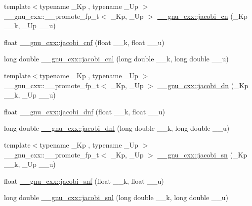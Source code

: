 \begin{DoxyCompactItemize}
\item 
{\footnotesize template$<$typename \+\_\+\+Kp , typename \+\_\+\+Up $>$ }\\\+\_\+\+\_\+gnu\+\_\+cxx\+::\+\_\+\+\_\+promote\+\_\+fp\+\_\+t$<$ \+\_\+\+Kp, \+\_\+\+Up $>$ \hyperlink{group__gnu__math__spec__func_ga51512996a910489b4554daa7507a48f1}{\+\_\+\+\_\+gnu\+\_\+cxx\+::jacobi\+\_\+cn} (\+\_\+\+Kp \+\_\+\+\_\+k, \+\_\+\+Up \+\_\+\+\_\+u)
\item 
float \hyperlink{group__gnu__math__spec__func_gadbd6320123f45ae10d539cf8df0373cd}{\+\_\+\+\_\+gnu\+\_\+cxx\+::jacobi\+\_\+cnf} (float \+\_\+\+\_\+k, float \+\_\+\+\_\+u)
\item 
long double \hyperlink{group__gnu__math__spec__func_ga08892965ea520116cc53a764513fe685}{\+\_\+\+\_\+gnu\+\_\+cxx\+::jacobi\+\_\+cnl} (long double \+\_\+\+\_\+k, long double \+\_\+\+\_\+u)
\item 
{\footnotesize template$<$typename \+\_\+\+Kp , typename \+\_\+\+Up $>$ }\\\+\_\+\+\_\+gnu\+\_\+cxx\+::\+\_\+\+\_\+promote\+\_\+fp\+\_\+t$<$ \+\_\+\+Kp, \+\_\+\+Up $>$ \hyperlink{group__gnu__math__spec__func_ga4c2e5ff17abaab5217d4dbcbfd7366d8}{\+\_\+\+\_\+gnu\+\_\+cxx\+::jacobi\+\_\+dn} (\+\_\+\+Kp \+\_\+\+\_\+k, \+\_\+\+Up \+\_\+\+\_\+u)
\item 
float \hyperlink{group__gnu__math__spec__func_gae96327d678adc6b5c4051f1c3649549a}{\+\_\+\+\_\+gnu\+\_\+cxx\+::jacobi\+\_\+dnf} (float \+\_\+\+\_\+k, float \+\_\+\+\_\+u)
\item 
long double \hyperlink{group__gnu__math__spec__func_gae59786991abbf8359deef49b6323065a}{\+\_\+\+\_\+gnu\+\_\+cxx\+::jacobi\+\_\+dnl} (long double \+\_\+\+\_\+k, long double \+\_\+\+\_\+u)
\item 
{\footnotesize template$<$typename \+\_\+\+Kp , typename \+\_\+\+Up $>$ }\\\+\_\+\+\_\+gnu\+\_\+cxx\+::\+\_\+\+\_\+promote\+\_\+fp\+\_\+t$<$ \+\_\+\+Kp, \+\_\+\+Up $>$ \hyperlink{group__gnu__math__spec__func_ga5e39ec723669e132e27980dfdf766c19}{\+\_\+\+\_\+gnu\+\_\+cxx\+::jacobi\+\_\+sn} (\+\_\+\+Kp \+\_\+\+\_\+k, \+\_\+\+Up \+\_\+\+\_\+u)
\item 
float \hyperlink{group__gnu__math__spec__func_ga5981245b7343da6e21d445bb01fdba9c}{\+\_\+\+\_\+gnu\+\_\+cxx\+::jacobi\+\_\+snf} (float \+\_\+\+\_\+k, float \+\_\+\+\_\+u)
\item 
long double \hyperlink{group__gnu__math__spec__func_ga1c13539e3b051a07b1c28aa8a0aeb1b4}{\+\_\+\+\_\+gnu\+\_\+cxx\+::jacobi\+\_\+snl} (long double \+\_\+\+\_\+k, long double \+\_\+\+\_\+u)

\end{DoxyCompactItemize}
